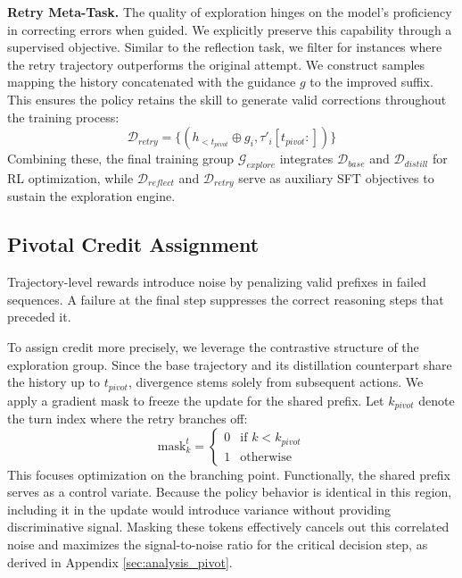 \documentclass[11pt]{article}
\begin{document}
\textbf{Retry Meta-Task.} The quality of exploration hinges on the model's proficiency in correcting errors when guided. We explicitly preserve this capability through a supervised objective. Similar to the reflection task, we filter for instances where the retry trajectory outperforms the original attempt. We construct samples mapping the history concatenated with the guidance $g$ to the improved suffix. This ensures the policy retains the skill to generate valid corrections throughout the training process:
\begin{equation}
    \mathcal{D}_{retry} = \{(h_{<t_{pivot}} \oplus g_i, \tau'_i[t_{pivot}:])\}
\end{equation}
Combining these, the final training group $\mathcal{G}_{explore}$ integrates $\mathcal{D}_{base}$ and $\mathcal{D}_{distill}$ for RL optimization, while $\mathcal{D}_{reflect}$ and $\mathcal{D}_{retry}$ serve as auxiliary SFT objectives to sustain the exploration engine.

\subsection{Pivotal Credit Assignment}
Trajectory-level rewards introduce noise by penalizing valid prefixes in failed sequences. A failure at the final step suppresses the correct reasoning steps that preceded it.

To assign credit more precisely, we leverage the contrastive structure of the exploration group. Since the base trajectory and its distillation counterpart share the history up to $t_{pivot}$, divergence stems solely from subsequent actions. We apply a gradient mask to freeze the update for the shared prefix. Let $k_{pivot}$ denote the turn index where the retry branches off:
\begin{equation}
    \text{mask}_k^t = \begin{cases}
        0 & \text{if } k < k_{pivot} \\
        1 & \text{otherwise}
    \end{cases}
\end{equation}
This focuses optimization on the branching point. Functionally, the shared prefix serves as a control variate. Because the policy behavior is identical in this region, including it in the update would introduce variance without providing discriminative signal. Masking these tokens effectively cancels out this correlated noise and maximizes the signal-to-noise ratio for the critical decision step, as derived in Appendix \ref{sec:analysis_pivot}.
\end{document}
